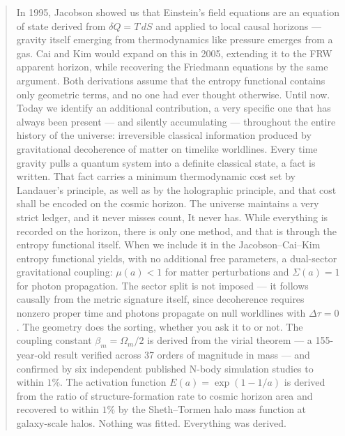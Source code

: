 \documentclass[twocolumn,a4paper,aps,prd,twocolumn,showpacs,notitlepage,superscriptaddress,nofootinbib]{article}
\begin{document}
\begin{center}

\begin{minipage}{0.80\textwidth}   %

\begin{abstract}
In 1995, Jacobson showed us that Einstein's field equations are an equation of state derived from $\delta Q = T\,dS$ and applied to local causal horizons ---
gravity itself emerging from thermodynamics like pressure emerges from a gas.
Cai and Kim would expand on this in 2005, extending it to the FRW apparent horizon, while recovering the
Friedmann equations by the same argument. Both derivations assume that the entropy
functional contains only geometric terms, and no one had ever thought otherwise. Until now.
Today we identify an additional contribution, a very specific one that has always been present --- and
silently accumulating --- throughout the entire history of the universe: irreversible classical information produced by gravitational decoherence of matter on timelike worldlines. 
Every time gravity pulls a quantum system into a definite classical state, a fact is written. That fact carries a minimum
thermodynamic cost set by Landauer's principle, as well as by the holographic
principle, and that cost shall be encoded on the cosmic horizon. The universe maintains a very strict ledger, and it never misses count, It never has. While everything is recorded on the horizon, there is only one method, and that is through the entropy functional itself. 
When we include it in the Jacobson--Cai--Kim entropy functional yields, with no
additional free parameters, a dual-sector gravitational coupling:
$\mu(a) < 1$ for matter perturbations and $\Sigma(a) = 1$ for photon
propagation. The sector split is not imposed --- it follows causally from the
metric signature itself, since decoherence requires nonzero proper time and
photons propagate on null worldlines with $\Delta\tau = 0$. The geometry does
the sorting, whether you ask it to or not. 
The coupling constant $\beta_m = \Omega_m/2$ is derived from the virial
theorem --- a 155-year-old result verified across 37 orders of magnitude in
mass --- and confirmed by six independent published N-body simulation studies
to within $1\%$. The activation function $E(a) = \exp(1 - 1/a)$ is derived
from the ratio of structure-formation rate to cosmic horizon area and
recovered to within $1\%$ by the Sheth--Tormen halo mass function at
galaxy-scale halos. Nothing was fitted. Everything was derived.

\end{abstract}
\end{minipage}
\end{center}
\end{document}
